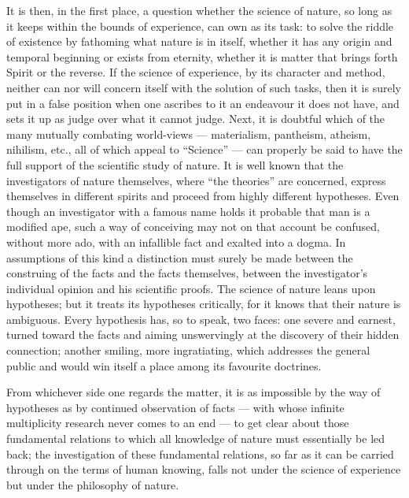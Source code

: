 \documentclass[12pt,a4paper]{book}
\begin{document}
It is then, in the first place, a question whether the science of nature, so
long as it keeps within the bounds of experience, can own as its task: to solve
the riddle of existence by fathoming what nature is in itself, whether it has
any origin and temporal beginning or exists from eternity, whether it is matter
that brings forth Spirit or the reverse. If the science of experience, by its
character and method, neither can nor will concern itself with the solution of
such tasks, then it is surely put in a false position when one ascribes to it
an endeavour it does not have, and sets it up as judge over what it cannot
judge. Next, it is doubtful which of the many mutually combating world-views
--- materialism, pantheism, atheism, nihilism, etc.,
all of which appeal to ``Science'' --- can properly be said to have the full
support of the scientific study of nature. It is well known that the
investigators of nature themselves, where ``the theories'' are concerned,
express themselves in different spirits and proceed from highly different
hypotheses. Even though an investigator with a famous name holds it probable
that man is a modified ape, such a way of conceiving may not on that account be
confused, without more ado, with an infallible fact and exalted into a dogma.
In assumptions of this kind a distinction must surely be made between the
construing of the facts and the facts themselves, between the investigator's
individual opinion and his scientific proofs. The science of nature leans upon
hypotheses; but it treats its hypotheses critically, for it knows that their
nature is ambiguous. Every hypothesis has, so to speak, two faces: one severe
and earnest, turned toward the facts and aiming unswervingly at the discovery
of their hidden connection; another smiling, more ingratiating, which addresses
the general public and would win itself a place among its favourite doctrines.

From whichever side one regards the matter, it is as impossible by the way of
hypotheses as by continued observation of facts --- with whose infinite
multiplicity research never comes to an end --- to get clear about those
fundamental relations to which all knowledge of nature must essentially be led
back; the investigation of
these fundamental relations, so far as it can be carried through on the terms
of human knowing, falls not under the science of experience but under the
philosophy of nature.
\end{document}
